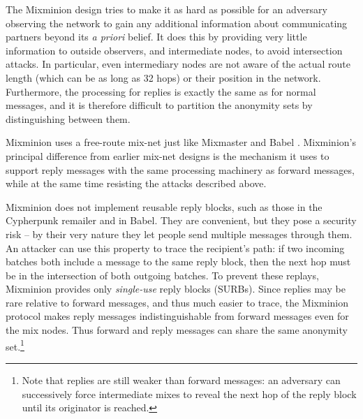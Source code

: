 \documentclass[times,10pt,twocolumn]{article}
\begin{document}
The Mixminion design tries to make it as hard as possible for an
adversary observing the network to gain any additional information
about communicating partners beyond its \emph{a priori} belief. It does
this by providing very little information to outside observers, and
intermediate nodes, to avoid intersection attacks. In particular, even
intermediary nodes are not aware of the actual route length (which can
be as long as 32 hops) or their position in the network. Furthermore,
the processing for replies is exactly the same as for normal messages,
and it is therefore difficult to partition the anonymity sets by
distinguishing between them. 




\label{sec:design}

Mixminion uses a free-route mix-net just like Mixmaster \cite{mixmaster-spec}
and Babel \cite{babel}.
Mixminion's principal difference from earlier mix-net
designs is the mechanism it uses to support reply messages with the
same processing machinery as forward messages, while at the same time
resisting the attacks described above.

Mixminion does not implement reusable reply blocks, such as those in
the Cypherpunk 
remailer and in Babel. They are convenient, but they pose a security
risk -- by their very nature they let people send multiple
messages through them.  An attacker can use this property to
trace the recipient's path: if two incoming batches both include a
message to the same reply block, then the next hop must be in the
intersection of both outgoing batches.  To prevent these replays,
Mixminion provides only \emph{single-use} reply blocks (SURBs). Since
replies may be rare relative to forward messages, and thus
much easier to trace, the Mixminion protocol makes reply messages
indistinguishable from forward messages even for the mix nodes. Thus
forward and reply messages can share the same anonymity
set.\footnote{Note that replies are still weaker than forward messages:
an adversary can successively force intermediate mixes to reveal the
next hop of the reply block until its originator is reached.}
\end{document}
